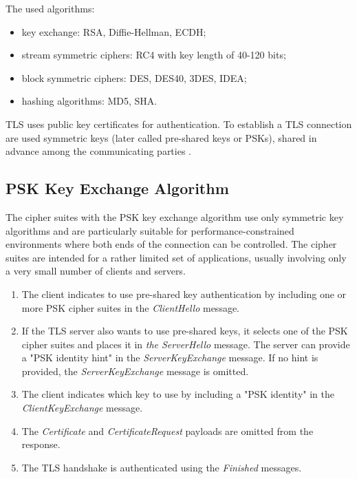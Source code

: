 \documentclass[
  digital, %
  notable,   %
  lof,     %
  lot,     %
]{fithesis3}
\begin{document}
The used algorithms:
\begin{itemize}[leftmargin=2em,rightmargin=1em,itemsep=0.75\parskip,parsep=0em,topsep=0em,partopsep=0em]
\item key exchange: RSA, Diffie-Hellman, ECDH;
\item stream symmetric ciphers: RC4 with key length of 40-120 bits;
\item block symmetric ciphers: DES, DES40, 3DES, IDEA;
\item hashing algorithms: MD5, SHA.
\end{itemize}
\vskip0.1in
TLS uses public key certificates for authentication. To establish a TLS connection are used 
symmetric keys (later called pre-shared keys or PSKs), shared in advance among the 
communicating parties \cite{eronen2005pre}.

\subsection{PSK Key Exchange Algorithm}\label{pskAlgorithm}
The cipher suites with the PSK key exchange algorithm use only symmetric key algorithms and 
are particularly suitable for performance-constrained environments where both ends of the 
connection can be controlled. The cipher suites are intended for a rather limited set of 
applications, usually involving only a very small number of clients and servers.

\begin{enumerate}
\item The client indicates to use pre-shared key authentication by including one or more PSK cipher suites in the \textit{ClientHello} message. 
\item If the TLS server also wants to use pre-shared keys, it selects one of the PSK cipher suites and places it in \textit{the ServerHello} message. The server can provide a "PSK identity hint" in the \textit{ServerKeyExchange} message. If no hint is provided, the \textit{ServerKeyExchange} message is omitted.
\item The client indicates which key to use by including a "PSK identity" in the \textit{ClientKeyExchange} message.
\item The \textit{Certificate} and \textit{CertificateRequest} payloads are omitted from the response.
\item The TLS handshake is authenticated using the \textit{Finished} messages. 
\end{enumerate}
\end{document}
